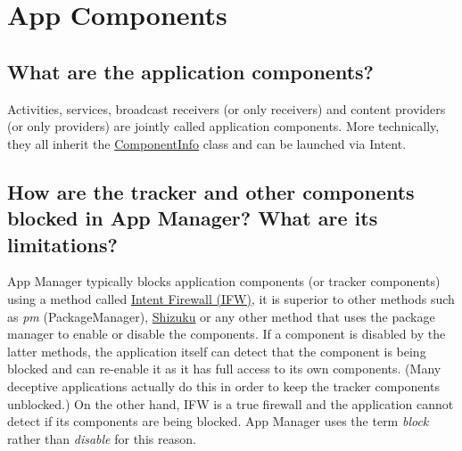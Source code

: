 \section{App Components}\label{sec:faq:app-components} %

\subsection{What are the application components?}\label{subsec:faq:what-are-app-components} %
Activities, services, broadcast receivers (or only receivers) and content providers (or only providers) are jointly
called application components. More technically, they all inherit the
\href{https://developer.android.com/reference/android/content/pm/ComponentInfo}{ComponentInfo} class and can be launched
via Intent.

\subsection{How are the tracker and other components blocked in App Manager? What are its limitations?}\label{subsec:faq:how-components-blocked} %
App Manager typically blocks application components (or tracker components) using a method called
\href{https://carteryagemann.com/pages/android-intent-firewall.html}{Intent Firewall (IFW)}, it is superior to
other methods such as \textit{pm} (PackageManager), \href{https://github.com/RikkaApps/Shizuku}{Shizuku} or any other
method that uses the package manager to enable or disable the components. If a component is disabled by the latter
methods, the application itself can detect that the component is being blocked and can re-enable it as it has full
access to its own components. (Many deceptive applications actually do this in order to keep the tracker components
unblocked.) On the other hand, IFW is a true firewall and the application cannot detect if its components are being
blocked. App Manager uses the term \textit{block} rather than \textit{disable} for this reason.

